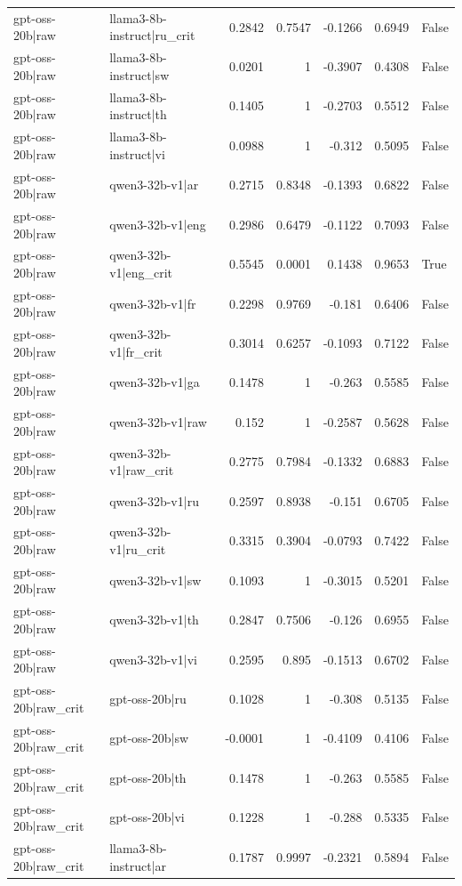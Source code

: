 \begin{table}
\begin{tabular}{l l r r r r l}
gpt-oss-20b|raw & llama3-8b-instruct|ru_crit & 0.2842 & 0.7547 & -0.1266 & 0.6949 & False \\
gpt-oss-20b|raw & llama3-8b-instruct|sw & 0.0201 & 1 & -0.3907 & 0.4308 & False \\
gpt-oss-20b|raw & llama3-8b-instruct|th & 0.1405 & 1 & -0.2703 & 0.5512 & False \\
gpt-oss-20b|raw & llama3-8b-instruct|vi & 0.0988 & 1 & -0.312 & 0.5095 & False \\
gpt-oss-20b|raw & qwen3-32b-v1|ar & 0.2715 & 0.8348 & -0.1393 & 0.6822 & False \\
gpt-oss-20b|raw & qwen3-32b-v1|eng & 0.2986 & 0.6479 & -0.1122 & 0.7093 & False \\
gpt-oss-20b|raw & qwen3-32b-v1|eng_crit & 0.5545 & 0.0001 & 0.1438 & 0.9653 & True \\
gpt-oss-20b|raw & qwen3-32b-v1|fr & 0.2298 & 0.9769 & -0.181 & 0.6406 & False \\
gpt-oss-20b|raw & qwen3-32b-v1|fr_crit & 0.3014 & 0.6257 & -0.1093 & 0.7122 & False \\
gpt-oss-20b|raw & qwen3-32b-v1|ga & 0.1478 & 1 & -0.263 & 0.5585 & False \\
gpt-oss-20b|raw & qwen3-32b-v1|raw & 0.152 & 1 & -0.2587 & 0.5628 & False \\
gpt-oss-20b|raw & qwen3-32b-v1|raw_crit & 0.2775 & 0.7984 & -0.1332 & 0.6883 & False \\
gpt-oss-20b|raw & qwen3-32b-v1|ru & 0.2597 & 0.8938 & -0.151 & 0.6705 & False \\
gpt-oss-20b|raw & qwen3-32b-v1|ru_crit & 0.3315 & 0.3904 & -0.0793 & 0.7422 & False \\
gpt-oss-20b|raw & qwen3-32b-v1|sw & 0.1093 & 1 & -0.3015 & 0.5201 & False \\
gpt-oss-20b|raw & qwen3-32b-v1|th & 0.2847 & 0.7506 & -0.126 & 0.6955 & False \\
gpt-oss-20b|raw & qwen3-32b-v1|vi & 0.2595 & 0.895 & -0.1513 & 0.6702 & False \\
gpt-oss-20b|raw_crit & gpt-oss-20b|ru & 0.1028 & 1 & -0.308 & 0.5135 & False \\
gpt-oss-20b|raw_crit & gpt-oss-20b|sw & -0.0001 & 1 & -0.4109 & 0.4106 & False \\
gpt-oss-20b|raw_crit & gpt-oss-20b|th & 0.1478 & 1 & -0.263 & 0.5585 & False \\
gpt-oss-20b|raw_crit & gpt-oss-20b|vi & 0.1228 & 1 & -0.288 & 0.5335 & False \\
gpt-oss-20b|raw_crit & llama3-8b-instruct|ar & 0.1787 & 0.9997 & -0.2321 & 0.5894 & False \\

\end{tabular}
\end{table}
